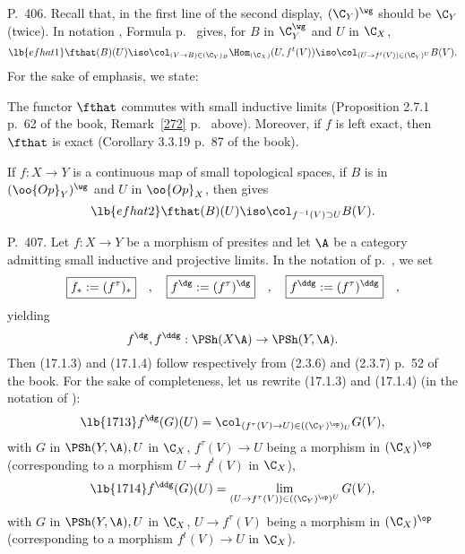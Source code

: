 \documentclass[12pt]{article}
\theoremstyle{remark}
\theoremstyle{definition}
\begin{document}
\begin{s}
P.~406. Recall that, in the first line of the second display, $(\C_Y)^\wg$ should be $\C_Y$ (twice). In notation , Formula  p.~ gives, for $B$ in $\C_Y^\wg$ and $U$ in $\C_X$, 
%
\begin{equation}\lb{efhat1}
\fthat(B)(U)\iso\col_{(V\to B)\in(\C_Y)_B}\Hom_{(\C_X)}(U,f^t(V))\iso\col_{(U\to f^t(V))\in(\C_Y)^U}B(V).
\end{equation}
%
For the sake of emphasis, we state: 

\begin{prop}
The functor $\fthat$ commutes with small inductive limits (Proposition 2.7.1 p.~62 of the book, Remark~\ref{272} p.~ above). Moreover, if $f$ is left exact, then $\fthat$ is exact (Corollary 3.3.19 p.~87 of the book).
\end{prop}

If $f:X\to Y$ is a continuous map of small topological spaces, if $B$ is in $(\oo{Op}_Y)^\wg$ and $U$ in $\oo{Op}_X$, then  gives 
%
\begin{equation}\lb{efhat2}
\fthat(B)(U)\iso\col_{f^{-1}(V)\supset U}B(V).
\end{equation}
%
\end{s}

%

\begin{s} 
P.~407. Let $f:X\to Y$ be a morphism of presites and let $\A$ be a category admitting small inductive and projective limits. In the notation of  p.~, we set 
$$
\boxed{f_*:=(f^\tau)_*}\quad,\quad\boxed{f^\dg:=(f^\tau)^\dg}\quad,\quad\boxed{f^\ddg:=(f^\tau)^\ddg}\quad,
$$ 
yielding
$$
f^\dg,f^\ddg:\PSh(X\A)\to\PSh(Y,\A).
$$
Then (17.1.3) and (17.1.4) follow respectively from (2.3.6) and (2.3.7) p.~52 of the book. For the sake of completeness, let us rewrite (17.1.3) and (17.1.4) (in the notation of ):
%
\begin{equation}\lb{1713}
f^\dg(G)(U)=\col_{(f^\tau(V)\to U)\in((\C_Y)^{\op})_U}G(V),
\end{equation}
%
with $G$ in $\PSh(Y,\A),U$ in $\C_X$, $f^\tau(V)\to U$ being a morphism in $(\C_X)^{\op}$ (corresponding to a morphism $U\to f^t(V)$ in $\C_X$), 
%
\begin{equation}\lb{1714}
f^\ddg(G)(U)=\lim_{(U\to f^\tau(V))\in((\C_Y)^{\op})^U}G(V),
\end{equation}
%
with $G$ in $\PSh(Y,\A),U$ in $\C_X$, $U\to f^\tau(V)$ being a morphism in $(\C_X)^{\op}$ (corresponding to a morphism $f^t(V)\to U$ in $\C_X$).
\end{s}
\end{document}

